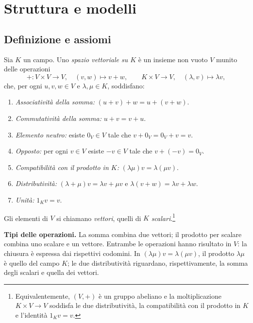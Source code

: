 \section{Struttura e modelli}
\subsection{Definizione e assiomi}

\begin{definizione}
Sia $K$ un campo. Uno \emph{spazio vettoriale su $K$} è un insieme non vuoto $V$ munito delle operazioni
\[
  +\colon V\times V\longrightarrow V,\quad (v,w)\longmapsto v+w,
  \qquad
  K\times V\longrightarrow V,\quad (\lambda,v)\longmapsto\lambda v,
\]
che, per ogni $u,v,w\in V$ e $\lambda,\mu\in K$, soddisfano:
\begin{enumerate}[label=(\alph*)]
  \item \emph{Associatività della somma:} $(u+v)+w=u+(v+w)$.
  \item \emph{Commutatività della somma:} $u+v=v+u$.
  \item \emph{Elemento neutro:} esiste $0_V\in V$ tale che $v+0_V=0_V+v=v$.
  \item \emph{Opposto:} per ogni $v\in V$ esiste $-v\in V$ tale che $v+(-v)=0_V$.
  \item \emph{Compatibilità con il prodotto in $K$:} $(\lambda\mu)v=\lambda(\mu v)$.
  \item \emph{Distributività:} $(\lambda+\mu)v=\lambda v+\mu v$ e $\lambda(v+w)=\lambda v+\lambda w$.
  \item \emph{Unità:} $1_Kv=v$.
\end{enumerate}
Gli elementi di $V$ si chiamano \emph{vettori}, quelli di $K$ \emph{scalari}.\footnote{Equivalentemente, $(V,+)$ è un gruppo abeliano e la moltiplicazione $K\times V\to V$ soddisfa le due distributività, la compatibilità con il prodotto in $K$ e l'identità $1_Kv=v$.}
\end{definizione}

\textbf{Tipi delle operazioni.} La somma combina due vettori; il prodotto per scalare combina uno scalare e un vettore. Entrambe le operazioni hanno risultato in $V$: la chiusura è espressa dai rispettivi codomini. In $(\lambda\mu)v=\lambda(\mu v)$, il prodotto $\lambda\mu$ è quello del campo $K$; le due distributività riguardano, rispettivamente, la somma degli scalari e quella dei vettori.

